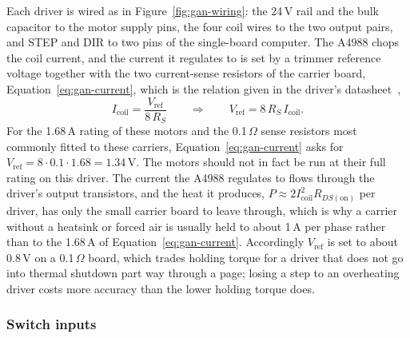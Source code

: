 Each driver is wired as in Figure~\ref{fig:gan-wiring}: the 24\,V rail and the bulk capacitor to the motor supply pins, the four coil wires to the two output pairs, and STEP and DIR to two pins of the single-board computer. The A4988 chops the coil current, and the current it regulates to is set by a trimmer reference voltage together with the two current-sense resistors of the carrier board, Equation~\ref{eq:gan-current}, which is the relation given in the driver's datasheet~\cite{a4988ds},
\begin{equation}
I_{\mathrm{coil}}=\frac{V_{\mathrm{ref}}}{8\,R_S}\qquad\Longrightarrow\qquad V_{\mathrm{ref}}=8\,R_S\,I_{\mathrm{coil}}.
\label{eq:gan-current}
\end{equation}
For the 1.68\,A rating of these motors and the 0.1\,$\Omega$ sense resistors most commonly fitted to these carriers, Equation~\ref{eq:gan-current} asks for $V_{\mathrm{ref}}=8\cdot0.1\cdot1.68=1.34$\,V.
The motors should not in fact be run at their full rating on this driver.
The current the A4988 regulates to flows through the driver's output transistors, and the heat it produces, $P\approx2I_{\mathrm{coil}}^2R_{DS(\mathrm{on})}$ per driver, has only the small carrier board to leave through, which is why a carrier without a heatsink or forced air is usually held to about 1\,A per phase rather than to the 1.68\,A of Equation~\ref{eq:gan-current}.
Accordingly $V_{\mathrm{ref}}$ is set to about $0.8$\,V on a 0.1\,$\Omega$ board, which trades holding torque for a driver that does not go into thermal shutdown part way through a page; losing a step to an overheating driver costs more accuracy than the lower holding torque does.


\subsubsection{Switch inputs}
\label{sec:gan-switch}

